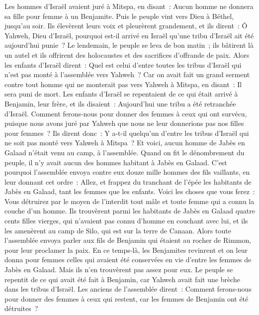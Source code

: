 \begin{multicols}{2}
\VerseOne{}Les hommes d'Israël avaient juré à Mitspa, en disant~: Aucun homme ne donnera sa fille pour femme à un Benjamite.
Puis le peuple vint vers Dieu à Béthel, jusqu'au soir. Ils élevèrent leurs voix et pleurèrent grandement,
et ils dirent~: Ô Yahweh, Dieu d'Israël, pourquoi est-il arrivé en Israël qu'une tribu d'Israël ait été aujourd'hui punie~?
Le lendemain, le peuple se leva de bon matin~; ils bâtirent là un autel et ils offrirent des holocaustes et des sacrifices d'offrande de paix.
Alors les enfants d'Israël dirent~: Quel est celui d'entre toutes les tribus d'Israël qui n'est pas monté à l'assemblée vers Yahweh~? Car on avait fait un grand serment contre tout homme qui ne monterait pas vers Yahweh à Mitspa, en disant~: Il sera puni de mort.
Les enfants d'Israël se repentaient de ce qui était arrivé à Benjamin, leur frère, et ils disaient~: Aujourd'hui une tribu a été retranchée d'Israël.
Comment ferons-nous pour donner des femmes à ceux qui ont survécu, puisque nous avons juré par Yahweh que nous ne leur donnerions pas nos filles pour femmes~?
Ils dirent donc~: Y a-t-il quelqu'un d'entre les tribus d'Israël qui ne soit pas monté vers Yahweh à Mitspa~? Et voici, aucun homme de Jabès en Galaad n'était venu au camp, à l'assemblée.
Quand on fit le dénombrement du peuple, il n'y avait aucun des hommes habitant à Jabès en Galaad.
C'est pourquoi l'assemblée envoya contre eux douze mille hommes des fils vaillants, en leur donnant cet ordre~: Allez, et frappez du tranchant de l'épée les habitants de Jabès en Galaad, tant les femmes que les enfants.
Voici les choses que vous ferez~: Vous détruirez par le moyen de l'interdit tout mâle et toute femme qui a connu la couche d'un homme.
Ils trouvèrent parmi les habitants de Jabès en Galaad quatre cents filles vierges, qui n'avaient pas connu d'homme en couchant avec lui, et ils les amenèrent au camp de Silo, qui est sur la terre de Canaan.
Alors toute l'assemblée envoya parler aux fils de Benjamin qui étaient au rocher de Rimmon, pour leur proclamer la paix.
En ce temps-là, les Benjamites revinrent et on leur donna pour femmes celles qui avaient été conservées en vie d'entre les femmes de Jabès en Galaad. Mais ils n'en trouvèrent pas assez pour eux.
Le peuple se repentit de ce qui avait été fait à Benjamin, car Yahweh avait fait une brèche dans les tribus d'Israël.
Les anciens de l'assemblée dirent~: Comment ferons-nous pour donner des femmes à ceux qui restent, car les femmes de Benjamin ont été détruites~?

\end{multicols}
